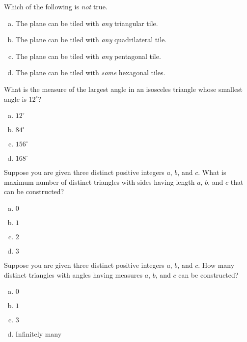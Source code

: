 \documentclass[12pt,letterpaper]{exam}
\begin{document}
\begin{questions}
\newpage



\question Which of the following is \textit{not} true. 
	\begin{enumerate}[(a)]
	\item The plane can be tiled with \textit{any} triangular tile. 
	\item The plane can be tiled with \textit{any} quadrilateral tile. 
	\item The plane can be tiled with \textit{any} pentagonal tile. 
	\item The plane can be tiled with \textit{some} hexagonal tiles. 
	\end{enumerate} \vfill



\question What is the measure of the largest angle in an isosceles triangle whose smallest angle is $12^\circ$?
	\begin{enumerate}[(a)]
	\item $12^\circ$
	\item $84^\circ$
	\item $156^\circ$
	\item $168^\circ$
	\end{enumerate} \vfill



\question Suppose you are given three distinct positive integers $a$, $b$, and $c$. What is maximum number of distinct triangles with sides having length $a$, $b$, and $c$ that can be constructed?
	\begin{enumerate}[(a)]
	\item $0$
	\item $1$
	\item $2$
	\item $3$
	\end{enumerate} \vfill



\question Suppose you are given three distinct positive integers $a$, $b$, and $c$. How many distinct triangles with angles having measures $a$, $b$, and $c$ can be constructed? 
	\begin{enumerate}[(a)]
	\item $0$
	\item $1$
	\item $3$
	\item Infinitely many
	\end{enumerate} \vfill




\end{questions}
\end{document}
